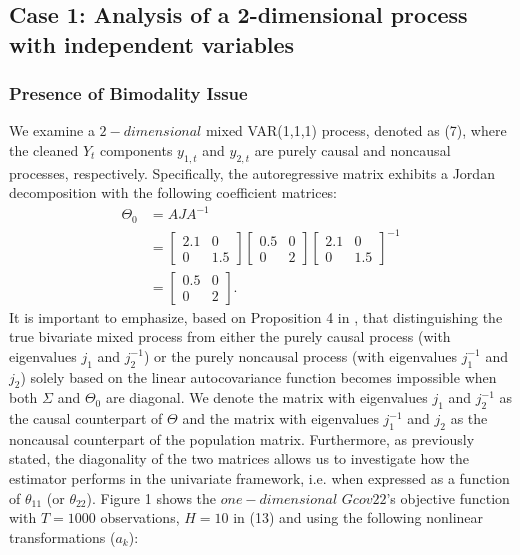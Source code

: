 \documentclass[<1p>]{elsarticle} %
\begin{document}
\subsection{\textbf{Case 1: Analysis of a 2-dimensional process with independent variables}}
\subsubsection{\textbf{Presence of Bimodality Issue}}
We examine a $2-dimensional$ mixed VAR(1,1,1) process, denoted as (7), where the cleaned $Y_t$ components $y_{1,t}$ and $y_{2,t}$ are purely causal and noncausal processes, respectively. Specifically, the autoregressive matrix exhibits a Jordan decomposition with the following coefficient matrices:
\begin{equation}
\begin{split}
\Theta_{0} &=A J A^{-1}\\
&=\begin{bmatrix}
2.1 & 0\\
0 & 1.5
\end{bmatrix}\begin{bmatrix}
0.5 & 0\\
0 & 2
\end{bmatrix}\begin{bmatrix}
2.1 & 0\\
0 & 1.5
\end{bmatrix}^{-1}\\
&=\begin{bmatrix}
0.5 & 0\\
0 & 2
\end{bmatrix}.
\end{split}
\end{equation}
It is important to emphasize, based on Proposition 4 in \cite{gourieroux2017noncausal}, that distinguishing the true bivariate mixed process from either the purely causal process (with eigenvalues $j_1$ and $j_2^{-1}$) or the purely noncausal process (with eigenvalues $j_1^{-1}$ and $j_2$) solely based on the linear autocovariance function becomes impossible when both $\Sigma$ and $\Theta_0$ are diagonal. We denote the matrix with eigenvalues $j_1$ and $j_2^{-1}$ as the causal counterpart of $\Theta$ and the matrix with eigenvalues $j_1^{-1}$ and $j_2$ as the noncausal counterpart of the population matrix. Furthermore, as previously stated, the diagonality of the two matrices allows us to investigate how the estimator performs in the univariate framework, i.e. when expressed as a function of $\theta_{11}$ (or $\theta_{22}$). Figure 1 shows the $one-dimensional$ $Gcov22$'s objective function with $T=1000$ observations, $H=10$ in (13) and using the following nonlinear transformations ($a_{k}$):
\end{document}
